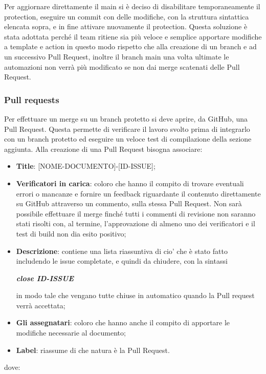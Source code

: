         Per aggiornare direttamente il main si è deciso di disabilitare temporaneamente
        il protection, eseguire un commit con delle modifiche, con la struttura sintattica elencata sopra, e in fine attivare nuovamente il protection.
        Questa soluzione è stata adottata perché il team ritiene sia più veloce e semplice apportare modifiche a template e action in questo modo
        rispetto che alla creazione di un branch e ad un successivo Pull Request, inoltre il branch main una volta ultimate le automazioni non verrà più modificato se non dai merge
        scatenati delle Pull Request.

        \subsubsection{Pull requests}\label{inf:pr}
        Per effettuare un merge su un branch protetto si deve aprire, da GitHub, una Pull Request. Questa
        permette di verificare il lavoro svolto prima di integrarlo con un branch protetto ed eseguire un veloce test di compilazione della sezione aggiunta.
        Alla creazione di una Pull Request bisogna associare:
        \begin{itemize}
            \item \textbf{Title}: [NOME-DOCUMENTO]-[ID-ISSUE];
            \item \textbf{Verificatori in carica}: coloro che hanno il compito di trovare eventuali errori o mancanze e fornire un feedback
            riguardante il contenuto direttamente su GitHub attraverso un commento, sulla stessa Pull Request.
            Non sarà possibile effettuare il merge finché tutti i commenti di revisione non saranno stati risolti
            con, al termine, l'approvazione di almeno uno dei verificatori e il test di build non dia esito positivo;
            \item \textbf{Descrizione}: contiene una lista riassuntiva di cio' che è stato fatto includendo le issue completate, e quindi da chiudere,
            con la sintassi
            \begin{center}
                \textbf{\textit{close ID-ISSUE}}
            \end{center}
            in modo tale che vengano tutte chiuse in automatico quando la Pull request verrà accettata;
            \item \textbf{Gli assegnatari}: coloro che hanno anche il compito di apportare le modifiche necessarie al documento;
            \item \textbf{Label}: riassume di che natura è la Pull Request.
        \end{itemize}
        dove:

